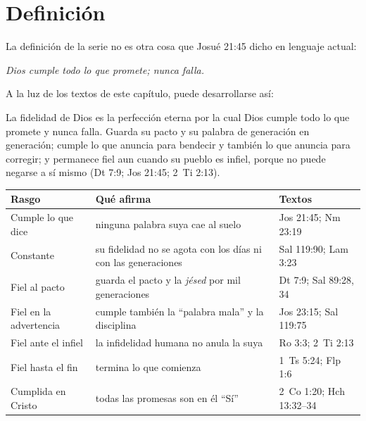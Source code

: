 
\section{Definición}

La definición de la serie no es otra cosa que Josué 21:45 dicho en lenguaje actual:

\begin{tcolorbox}[colback=papiro,colframe=dorado,boxrule=1.2pt,arc=3pt]
\centering\large\itshape Dios cumple todo lo que promete; nunca falla.
\end{tcolorbox}

A la luz de los textos de este capítulo, puede desarrollarse así:

\begin{tcolorbox}[colback=papiro,colframe=azul,boxrule=1pt,arc=3pt,fonttitle=\bfseries,title=Definición]
La fidelidad de Dios es la perfección eterna por la cual Dios cumple todo lo que promete y nunca falla. Guarda su pacto y su palabra de generación en generación; cumple lo que anuncia para bendecir y también lo que anuncia para corregir; y permanece fiel aun cuando su pueblo es infiel, porque no puede negarse a sí mismo (Dt 7:9; Jos 21:45; 2~Ti 2:13).
\end{tcolorbox}

\begin{center}\small\renewcommand{\arraystretch}{1.2}
\begin{tabular}{@{}L{3.6cm}L{6.4cm}L{4.4cm}@{}}
\toprule
\textbf{Rasgo} & \textbf{Qué afirma} & \textbf{Textos} \\ \midrule
Cumple lo que dice & ninguna palabra suya cae al suelo & Jos 21:45; Nm 23:19 \\
Constante & su fidelidad no se agota con los días ni con las generaciones & Sal 119:90; Lam 3:23 \\
Fiel al pacto & guarda el pacto y la \emph{jésed} por mil generaciones & Dt 7:9; Sal 89:28, 34 \\
Fiel en la advertencia & cumple también la ``palabra mala'' y la disciplina & Jos 23:15; Sal 119:75 \\
Fiel ante el infiel & la infidelidad humana no anula la suya & Ro 3:3; 2~Ti 2:13 \\
Fiel hasta el fin & termina lo que comienza & 1~Ts 5:24; Flp 1:6 \\
Cumplida en Cristo & todas las promesas son en él ``Sí'' & 2~Co 1:20; Hch 13:32--34 \\
\bottomrule
\end{tabular}\end{center}

